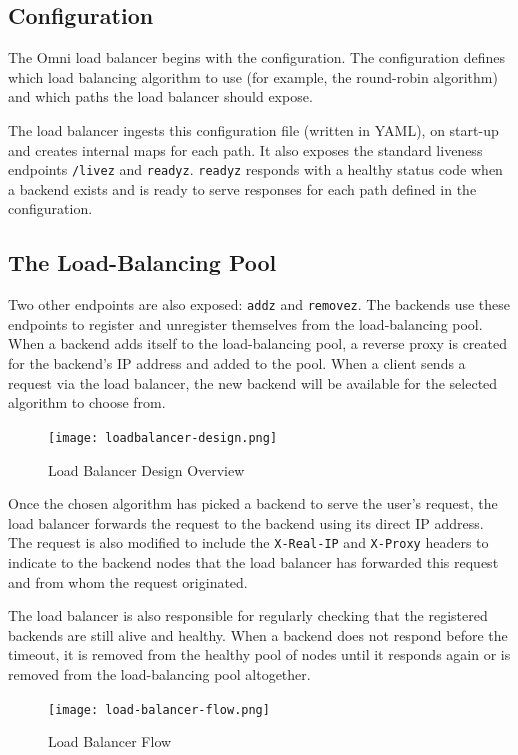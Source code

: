 \subsection{Configuration}
The Omni load balancer begins with the configuration. The configuration defines which load balancing algorithm to use (for example, the round-robin algorithm) and which paths the load balancer should expose. 

The load balancer ingests this configuration file (written in YAML), on start-up and creates internal maps for each path.
It also exposes the standard liveness endpoints \verb|/livez| and \verb|readyz|. \verb|readyz| responds with a healthy status code when a backend exists and is ready to serve responses for each path defined in the configuration.

\subsection{The Load-Balancing Pool}
Two other endpoints are also exposed: \verb|addz| and \verb|removez|. The backends use these endpoints to register and unregister themselves from the load-balancing pool. 
When a backend adds itself to the load-balancing pool, a reverse proxy is created for the backend's IP address and added to the pool.
When a client sends a request via the load balancer, the new backend will be available for the selected algorithm to choose from.

\begin{figure}[htbp]
\texttt{[image: loadbalancer-design.png]}
\centering
\caption{Load Balancer Design Overview}
\label{fig:loadbalancer-design}
\end{figure}

Once the chosen algorithm has picked a backend to serve the user's request, the load balancer forwards the request to the backend using its direct IP address.
The request is also modified to include the \verb|X-Real-IP| and \verb|X-Proxy| headers to indicate to the backend nodes that the load balancer has forwarded this request and from whom the request originated. 

The load balancer is also responsible for regularly checking that the registered backends are still alive and healthy. When a backend does not respond before the timeout, it is removed from the healthy pool of nodes until it responds again or is removed from the load-balancing pool altogether.

\begin{figure}[htbp]
\texttt{[image: load-balancer-flow.png]}
\centering
\caption{Load Balancer Flow}
\label{fig:loadbalancer-flow}
\end{figure}

